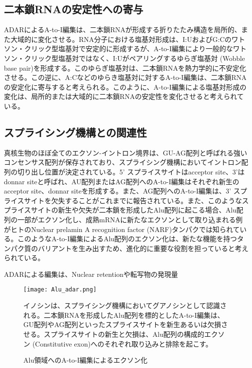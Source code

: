 \subsection{二本鎖RNAの安定性への寄与}
ADARによるA-to-I編集は、二本鎖RNAが形成する折りたたみ構造を局所的、また大域的に変化させる。RNA分子における塩基対形成は、I:UおよびG:Cのワトソン・クリック型塩基対で安定的に形成するが、A-to-I編集により一般的なワトソン・クリック型塩基対ではなく、I:Uがペアリングするゆらぎ塩基対 (Wobble base pair)を形成する。このゆらぎ塩基対は、二本鎖RNAを熱力学的に不安定化させる。この逆に、A:Cなどのゆらき塩基対に対するA-to-I編集は、二本鎖RNAの安定化に寄与すると考えられる。このように、A-to-I編集による塩基対形成の変化は、局所的または大域的に二本鎖RNAの安定性を変化させると考えられている。


\subsection{スプライシング機構との関連性}
真核生物のほぼ全てのエクソン-イントロン境界は、GU-AG配列と呼ばれる強いコンセンサス配列が保存されており、スプライシング機構においてイントロン配列の切り出し位置が決定されている。5' スプライスサイトはacceptor site、3'はdonnar siteと呼ばれ、AU配列またはAG配列へのA-to-I編集はそれぞれ新生のacceptor site、donnar siteを形成する。また、AG配列へのA-to-I編集は、3' スプライスサイトを欠失することがこれまでに報告されている。また、このようなスプライスサイトの新生や欠失が二本鎖を形成したAlu配列に起こる場合、Alu配列の一部がエクソン化し、成熟mRNAに新たなエクソンとして取り込まれる例がヒトのNuclear prelamin A recognition factor (NARF)タンパクでは知られている。このようなA-to-I編集によるAlu配列のエクソン化は、新たな機能を持つタンパク質のバリアントを生み出すため、進化的に重要な役割を担っていると考えられている。
\par
ADARによる編集は、Nuclear retentionや転写物の発現量

\begin{figure}[!htbp]
	\begin{center}
		\texttt{[image: Alu\_adar.png]}
	\end{center}
	\caption{Alu領域へのA-to-I編集によるエクソン化}
	\begin{flushleft}
		\small{イノシンは、スプライシング機構においてグアノシンとして認識される。二本鎖RNAを形成したAlu配列を標的としたA-to-I編集は、GU配列やAG配列といったスプライスサイトを新生あるいは欠損させる。スプライスサイトの新生と欠損は、Alu配列の構成的エクソン (Constitutive exon)へのそれぞれ取り込みと排除を起こす。}
	\end{flushleft}
	\label{fig:Alu_adar}
\end{figure}

